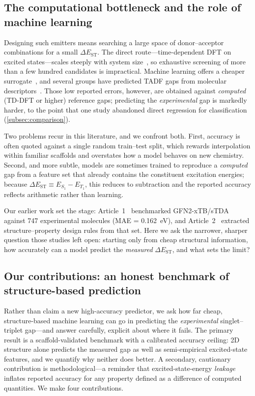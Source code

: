 \subsection{The computational bottleneck and the role of machine learning}

Designing such emitters means searching a large space of donor--acceptor
combinations for a small $\Delta E_\text{ST}$. The direct route---time-dependent
DFT on excited states---scales steeply with system size~\cite{Curtarolo2013},
so exhaustive screening of more than a few hundred candidates is impractical.
Machine learning offers a cheaper surrogate~\cite{Butler2018, Pyzer-Knapp2022},
and several groups have predicted TADF gaps from molecular
descriptors~\cite{Gomez-Bombarelli2016, Barneschi2024}. Those low reported errors,
however, are obtained against \emph{computed} (TD-DFT or higher) reference gaps;
predicting the \emph{experimental} gap is markedly harder, to the point that one
study abandoned direct regression for classification~\cite{Nigam2024}
(\cref{subsec:comparison}).

Two problems recur in this literature, and we confront both. First, accuracy is
often quoted against a single random train--test split, which rewards
interpolation within familiar scaffolds and overstates how a model behaves on new
chemistry. Second, and more subtle, models are sometimes trained to reproduce a
\emph{computed} gap from a feature set that already contains the constituent
excitation energies; because $\Delta E_\text{ST}\equiv E_{S_1}-E_{T_1}$, this
reduces to subtraction and the reported accuracy reflects arithmetic rather than
learning.

Our earlier work set the stage: Article~1~\cite{Tchapet2024_xTB} benchmarked
GFN2-xTB/sTDA against \num{747} experimental molecules
(MAE = \qty{0.162}{\electronvolt}), and Article~2~\cite{Tchapet2024_DataDriven}
extracted structure--property design rules from that set. Here we ask the
narrower, sharper question those studies left open: starting only from cheap
structural information, how accurately can a model predict the \emph{measured}
$\Delta E_\text{ST}$, and what sets the limit?

\subsection{Our contributions: an honest benchmark of structure-based prediction}

Rather than claim a new high-accuracy predictor, we ask how far cheap,
structure-based machine learning can go in predicting the \emph{experimental}
singlet--triplet gap---and answer carefully, explicit about where it fails. The
primary result is a scaffold-validated benchmark with a calibrated accuracy ceiling:
2D structure alone predicts the measured gap as well as semi-empirical excited-state
features, and we quantify why neither does better. A secondary, cautionary
contribution is methodological---a reminder that excited-state-energy \emph{leakage}
inflates reported accuracy for any property defined as a difference of computed
quantities. We make four contributions.


